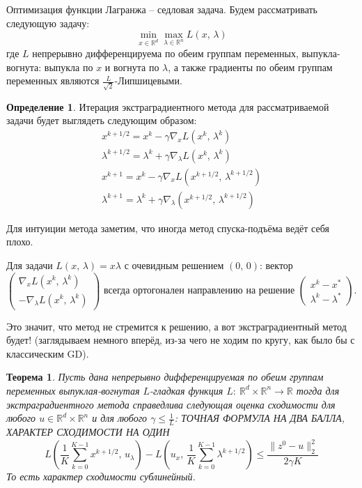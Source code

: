\documentclass[a4paper,12pt]{article}
\renewcommand{\leq}{\ensuremath{\leqslant}}
\theoremstyle{plain}
\newtheorem{theorem}{Теорема}[section]
\theoremstyle{definition}
\newtheorem{definition}{Определение}[section]
\theoremstyle{remark}
\begin{document}
Оптимизация функции Лагранжа -- седловая задача. Будем рассматривать следующую задачу:
\[
	\min_{x \in \mathbb{R}^d}\max_{\lambda \in \mathbb{R}^n} L(x,\, \lambda)
\]
где $L$ непрерывно дифференцируема по обеим группам переменных, выпукла-вогнута: выпукла по $x$ и вогнута по $\lambda$, а также градиенты по обеим группам переменных являются $\frac{L}{\sqrt{2}}$-Липшицевыми.

\begin{definition}
	Итерация экстраградиентного метода для рассматриваемой задачи будет выглядеть следующим образом:
	\begin{align*}
		x^{k + 1/2} = x^k - \gamma\nabla_xL(x^k,\, \lambda^k)                    \\
		\lambda^{k + 1/2} = \lambda^k + \gamma\nabla_\lambda L(x^k,\, \lambda^k) \\
		x^{k + 1} = x^k - \gamma\nabla_x L(x^{k + 1/2},\, \lambda^{k + 1/2})     \\
		\lambda^{k + 1} = \lambda^k + \gamma\nabla_\lambda(x^{k + 1/2},\, \lambda^{k + 1/2})
	\end{align*}
\end{definition}

Для интуиции метода заметим, что иногда метод спуска-подъёма ведёт себя плохо.

Для задачи $L(x,\, \lambda) = x\lambda$ с очевидным решением $(0,\, 0)$: вектор
$\begin{pmatrix}
		\nabla_x L(x^k,\, \lambda^k) \\
		-\nabla_\lambda L(x^k,\, \lambda^k)
	\end{pmatrix}$ всегда ортогонален направлению на решение $\begin{pmatrix}
		x^k - x^* \\
		\lambda^k - \lambda^*
	\end{pmatrix}$.

Это значит, что метод не стремится к решению, а вот экстраградиентный метод будет! (заглядываем немного вперёд, из-за чего не ходим по кругу, как было бы с классическим GD).

\begin{theorem}
	Пусть дана непрерывно дифференцируемая по обеим группам переменных выпуклая-вогнутая $L$-гладкая функция $L :\: \mathbb{R}^d \times \mathbb{R}^n \to \mathbb{R}$ тогда для экстраградиентного метода справедлива следующая оценка сходимости для любого $u \in \mathbb{R}^d \times \mathbb{R}^n$ и для любого $\gamma \leq \frac{1}{L}$: ТОЧНАЯ ФОРМУЛА НА ДВА БАЛЛА, ХАРАКТЕР СХОДИМОСТИ НА ОДИН
	\[
		L\left(\frac{1}{K}\sum_{k = 0}^{K - 1}x^{k + 1/2},\, u_\lambda\right) - L\left(u_x,\, \frac{1}{K}\sum_{k = 0}^{K - 1}\lambda^{k + 1/2}\right) \leq \frac{\|z^0 - u\|_2^2}{2\gamma K}
	\]
	То есть характер сходимости сублинейный.
\end{theorem}
\end{document}
